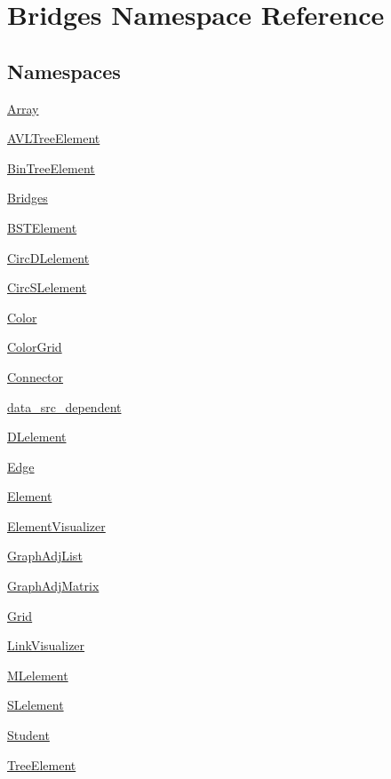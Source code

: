 \hypertarget{namespace_bridges}{}\section{Bridges Namespace Reference}
\label{namespace_bridges}
\subsection*{Namespaces}
\begin{DoxyCompactItemize}
\item 
 \hyperlink{namespace_bridges_1_1_array}{Array}
\item 
 \hyperlink{namespace_bridges_1_1_a_v_l_tree_element}{A\+V\+L\+Tree\+Element}
\item 
 \hyperlink{namespace_bridges_1_1_bin_tree_element}{Bin\+Tree\+Element}
\item 
 \hyperlink{namespace_bridges_1_1_bridges}{Bridges}
\item 
 \hyperlink{namespace_bridges_1_1_b_s_t_element}{B\+S\+T\+Element}
\item 
 \hyperlink{namespace_bridges_1_1_circ_d_lelement}{Circ\+D\+Lelement}
\item 
 \hyperlink{namespace_bridges_1_1_circ_s_lelement}{Circ\+S\+Lelement}
\item 
 \hyperlink{namespace_bridges_1_1_color}{Color}
\item 
 \hyperlink{namespace_bridges_1_1_color_grid}{Color\+Grid}
\item 
 \hyperlink{namespace_bridges_1_1_connector}{Connector}
\item 
 \hyperlink{namespace_bridges_1_1data__src__dependent}{data\+\_\+src\+\_\+dependent}
\item 
 \hyperlink{namespace_bridges_1_1_d_lelement}{D\+Lelement}
\item 
 \hyperlink{namespace_bridges_1_1_edge}{Edge}
\item 
 \hyperlink{namespace_bridges_1_1_element}{Element}
\item 
 \hyperlink{namespace_bridges_1_1_element_visualizer}{Element\+Visualizer}
\item 
 \hyperlink{namespace_bridges_1_1_graph_adj_list}{Graph\+Adj\+List}
\item 
 \hyperlink{namespace_bridges_1_1_graph_adj_matrix}{Graph\+Adj\+Matrix}
\item 
 \hyperlink{namespace_bridges_1_1_grid}{Grid}
\item 
 \hyperlink{namespace_bridges_1_1_link_visualizer}{Link\+Visualizer}
\item 
 \hyperlink{namespace_bridges_1_1_m_lelement}{M\+Lelement}
\item 
 \hyperlink{namespace_bridges_1_1_s_lelement}{S\+Lelement}
\item 
 \hyperlink{namespace_bridges_1_1_student}{Student}
\item 
 \hyperlink{namespace_bridges_1_1_tree_element}{Tree\+Element}
\end{DoxyCompactItemize}
